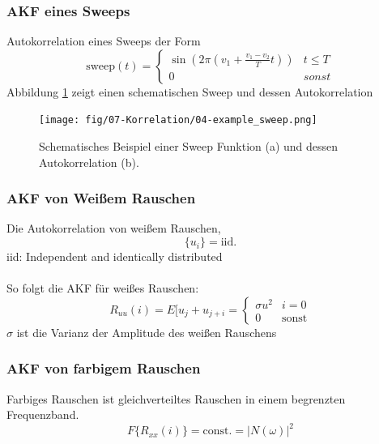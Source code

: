 \subsubsection*{AKF eines Sweeps}
Autokorrelation eines Sweeps der Form
\[
\mbox{sweep}(t)=
\begin{cases}
\sin \left(2\pi \left(v_1 + \frac{v_1-v_2}{T} t \right)\right) & t \leq T\\
0& sonst
\end{cases}
\]
Abbildung \ref{fig:korr_sweep} zeigt einen schematischen Sweep und dessen Autokorrelation

\begin{figure}[h!]
\centering
\texttt{[image: fig/07-Korrelation/04-example\_sweep.png]}
\caption{Schematisches Beispiel einer Sweep Funktion (a) und dessen Autokorrelation (b).}
\label{fig:korr_sweep}
\end{figure}

\subsubsection*{AKF von Weißem Rauschen}
Die Autokorrelation von weißem Rauschen,
\[
\{u_i\} = \mbox{iid}.
\]
{\small iid: Independent and identically distributed}\\\\
So folgt die AKF für weißes Rauschen:
\[
R_{uu}(i) = E[u_j + u_{j+i} =
\begin{cases}
\sigma u^2 & i=0\\
0 & \mbox{sonst}
\end{cases}
\]
{\small $\sigma$ ist die Varianz der Amplitude des weißen Rauschens}

\subsubsection*{AKF von farbigem Rauschen}
Farbiges Rauschen ist gleichverteiltes Rauschen in einem begrenzten Frequenzband.
\[
F\{R_{xx}(i)\} = \mbox{const.} = |N(\omega)|^2
\]

